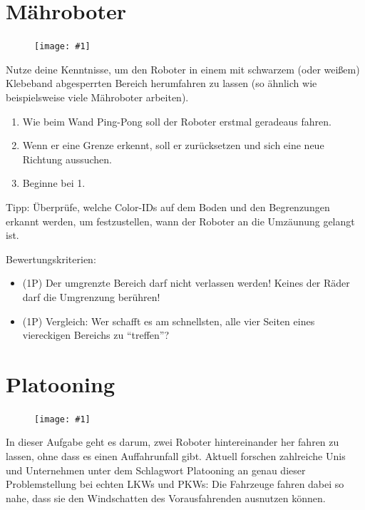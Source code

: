 \documentclass[
	12pt,
	article,
	type=bsc, %
	colorbacktitle,
	instlogo,
	accentcolor=tud1c,
	german,
	twoside
]{tudexercise}
\newcommand{\easygcenter}[1]{
	\begin{figure}[h]
	\centering 
	\texttt{[image: \#1]}
	\end{figure}
}
\begin{document}
\newpage
\section{Mähroboter}
\easygcenter{img/maehroboter.png}
Nutze deine Kenntnisse, um den Roboter in einem mit schwarzem (oder weißem) Klebeband abgesperrten Bereich herumfahren zu lassen (so ähnlich wie beispielsweise viele Mähroboter arbeiten).
\begin{enumerate}
\item Wie beim Wand Ping-Pong soll der Roboter erstmal geradeaus fahren.
\item Wenn er eine Grenze erkennt, soll er zurücksetzen und sich eine neue Richtung aussuchen.
\item Beginne bei 1.
\end{enumerate}

Tipp: Überprüfe, welche Color-IDs auf dem Boden und den Begrenzungen erkannt werden, um festzustellen, wann der Roboter an die Umzäunung gelangt ist.

Bewertungskriterien:
\begin{itemize}
\item (1P) Der umgrenzte Bereich darf nicht verlassen werden! Keines der Räder darf die Umgrenzung berühren!
\item (1P) Vergleich: Wer schafft es am schnellsten, alle vier Seiten eines viereckigen Bereichs zu “treffen”?
\end{itemize}

\newpage
\section{Platooning}
\easygcenter{img/platooning.png}
In dieser Aufgabe geht es darum, zwei Roboter hintereinander her fahren zu lassen, ohne dass es einen Auffahrunfall gibt. Aktuell forschen zahlreiche Unis und Unternehmen unter dem Schlagwort Platooning an genau dieser Problemstellung bei echten LKWs und PKWs: Die Fahrzeuge fahren dabei so nahe, dass sie den Windschatten des Vorausfahrenden ausnutzen können.
\end{document}
